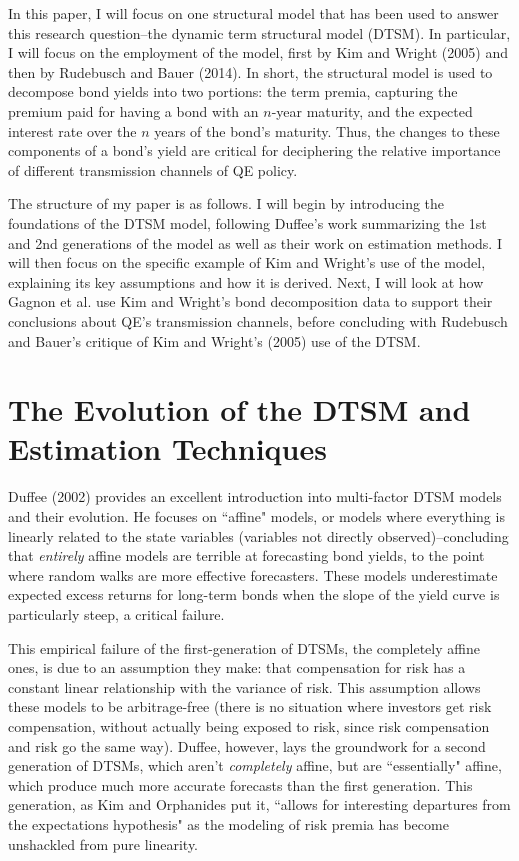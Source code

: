 \documentclass[12pt,final]{article}
\begin{document}
In this paper, I will focus on one structural model that has been used to answer this research question--the dynamic term structural model (DTSM). In particular, I will focus on the employment of the model, first by Kim and Wright (2005) and then by Rudebusch and Bauer (2014). \citep{Kim2005} \citep{Bauer2014} In short, the structural model is used to decompose bond yields into two portions: the term premia, capturing the premium paid for having a bond with an $n$-year maturity, and the expected interest rate over the $n$ years of the bond's maturity. Thus, the changes to these components of a bond's yield are critical for deciphering the relative importance of different transmission channels of QE policy. 

The structure of my paper is as follows. I will begin by introducing the foundations of the DTSM model, following Duffee's work summarizing the 1st and 2nd generations of the model as well as their work on estimation methods. \citep{Duffee2002} I will then focus on the specific example of Kim and Wright's use of the model, explaining its key assumptions and how it is derived. Next, I will look at how Gagnon et al. use Kim and Wright's bond decomposition data to support their conclusions about QE's transmission channels, before concluding with Rudebusch and Bauer's critique of Kim and Wright's (2005) use of the DTSM.

\section{The Evolution of the DTSM and Estimation Techniques}

Duffee (2002) provides an excellent introduction into multi-factor DTSM models and their evolution. \citep{Duffee2002} He focuses on ``affine" models, or models where everything is linearly related to the state variables (variables not directly observed)--concluding that \textit{entirely} affine models are terrible at forecasting bond yields, to the point where random walks are more effective forecasters. These models underestimate expected excess returns for long-term bonds when the slope of the yield curve is particularly steep, a critical failure. 

This empirical failure of the first-generation of DTSMs, the completely affine ones, is due to an assumption they make: that compensation for risk has a constant linear relationship with the variance of risk. This assumption allows these models to be arbitrage-free (there is no situation where investors get risk compensation, without actually being exposed to risk, since risk compensation and risk go the same way). Duffee, however, lays the groundwork for a second generation of DTSMs, which aren't \textit{completely} affine, but are ``essentially" affine, which produce much more accurate forecasts than the first generation. This generation, as Kim and Orphanides put it, ``allows for interesting departures from the expectations hypothesis" as the modeling of risk premia has become unshackled from pure linearity. \citep{Kim2012}
\end{document}
